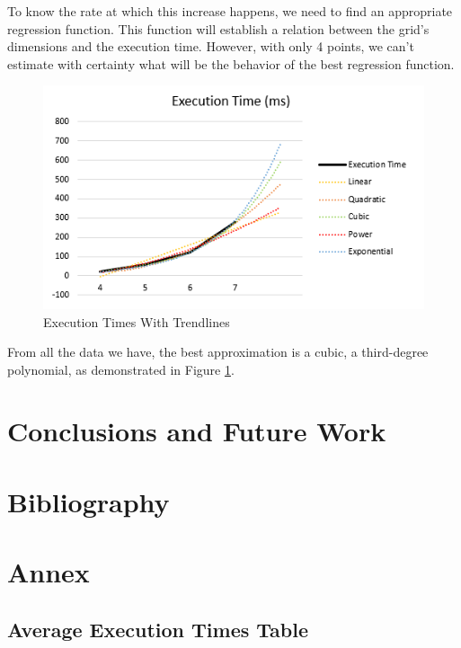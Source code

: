 \documentclass[runningheads]{llncs}
\begin{document}
To know the rate at which this increase happens, we need to find an appropriate regression function.
This function will establish a relation between the grid's dimensions and the execution time.
However, with only 4 points, we can't estimate with certainty what will be the behavior
    of the best regression function.

\begin{figure}
    \centering
    \includegraphics[scale=0.3]{img/dimensional_prediction.png}
    \caption{Execution Times With Trendlines} \label{fig6}
\end{figure}

From all the data we have, the best approximation is a cubic, a third-degree polynomial,
    as demonstrated in Figure \ref{fig6}.

\section{Conclusions and Future Work}

\section{Bibliography}

\section{Annex}

\subsection{Average Execution Times Table} \label{experiment-results}
\end{document}
